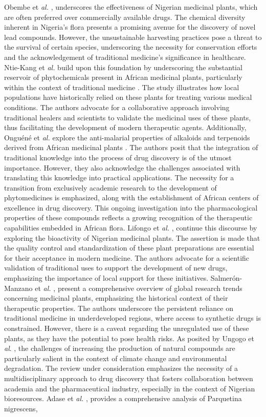 Obembe et \emph{al.} \cite{DikeI.2012}, underscores the effectiveness of Nigerian medicinal plants, which are often preferred over commercially available drugs. The chemical diversity inherent in Nigeria's flora presents a promising avenue for the discovery of novel lead compounds. However, the unsustainable harvesting practices pose a threat to the survival of certain species, underscoring the necessity for conservation efforts and the acknowledgement of traditional medicine's significance in healthcare. Ntie-Kang et \emph{al.} build upon this foundation by underscoring the substantial reservoir of phytochemicals present in African medicinal plants, particularly within the context of traditional medicine \cite{NtieKang2013a}. The study illustrates how local populations have historically relied on these plants for treating various medical conditions. The authors advocate for a collaborative approach involving traditional healers and scientists to validate the medicinal uses of these plants, thus facilitating the development of modern therapeutic agents. Additionally, Onguéné et \emph{al.} explore the anti-malarial properties of alkaloids and terpenoids derived from African medicinal plants \cite{AmoaOnguene2013}. The authors posit that the integration of traditional knowledge into the process of drug discovery is of the utmost importance. However, they also acknowledge the challenges associated with translating this knowledge into practical applications. The necessity for a transition from exclusively academic research to the development of phytomedicines is emphasized, along with the establishment of African centers of excellence in drug discovery. This ongoing investigation into the pharmacological properties of these compounds reflects a growing recognition of the therapeutic capabilities embedded in African flora. Lifongo et \emph{al.} \cite{Lifongo2014}, continue this discourse by exploring the bioactivity of Nigerian medicinal plants. The assertion is made that the quality control and standardization of these plant preparations are essential for their acceptance in modern medicine. The authors advocate for a scientific validation of traditional uses to support the development of new drugs, emphasizing the importance of local support for these initiatives. Salmerón-Manzano et \emph{al.} \cite{SalmeronManzano2020}, present a comprehensive overview of global research trends concerning medicinal plants, emphasizing the historical context of their therapeutic properties. The authors underscore the persistent reliance on traditional medicine in underdeveloped regions, where access to synthetic drugs is constrained. However, there is a caveat regarding the unregulated use of these plants, as they have the potential to pose health risks. As posited by Ungogo et \emph{al}. \cite{Ungogo2020}, the challenges of increasing the production of natural compounds are particularly salient in the context of climate change and environmental degradation. The review under consideration emphasizes the necessity of a multidisciplinary approach to drug discovery that fosters collaboration between academia and the pharmaceutical industry, especially in the context of Nigerian bioresources. Adase et \emph{al.} \cite{Adase2022}, provides a comprehensive analysis of Parquetina nigrescens, 